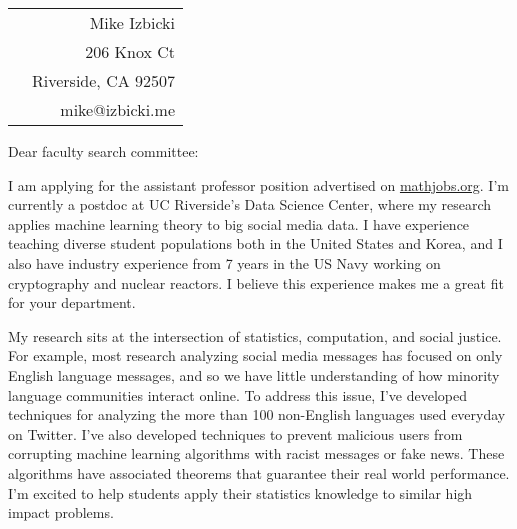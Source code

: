 \documentclass[12pt]{article}
\begin{document}
\noindent
\hspace{-0.13in}
\begin{tabularx}{1.03\textwidth}{Xr}
 & Mike Izbicki \\
 & 206 Knox Ct\\
 & Riverside, CA 92507\\
 & mike@izbicki.me\\
\end{tabularx}

\vspace{0.2in}

\setlength{\parskip}{15pt plus4mm minus3mm}

\noindent
Dear faculty search committee:

\noindent
I am applying for the assistant professor position advertised on \url{mathjobs.org}.
I'm currently a postdoc at UC Riverside's Data Science Center,
where my research applies machine learning theory to big social media data.
I have experience teaching diverse student populations both in the United States and Korea,
and I also have industry experience from 7 years in the US Navy working on cryptography and nuclear reactors.
I believe this experience makes me a great fit for your department.

\noindent
My research sits at the intersection of statistics, computation, and social justice.
For example, most research analyzing social media messages has focused on only English language messages,
and so we have little understanding of how minority language communities interact online.
To address this issue, I've developed techniques for analyzing the more than 100 non-English languages used everyday on Twitter.
I've also developed techniques to prevent malicious users from corrupting machine learning algorithms with racist messages or fake news.
These algorithms have associated theorems that guarantee their real world performance.
I'm excited to help students apply their statistics knowledge to similar high impact problems.
\end{document}
